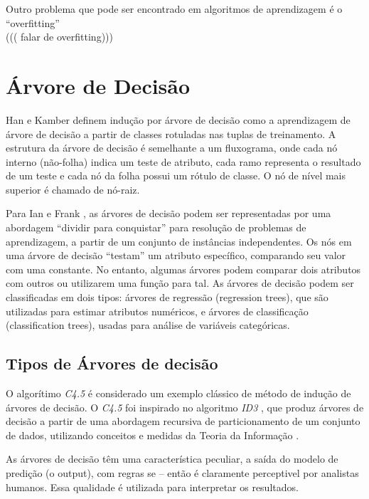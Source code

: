 Outro problema que pode ser encontrado em algoritmos de aprendizagem é o ``overfitting''\\

((( falar de overfitting)))

\pagebreak

\section{Árvore de Decisão}

Han e Kamber \cite{DataMining} definem indução por árvore de decisão como a aprendizagem de árvore de decisão a partir de classes rotuladas nas tuplas de treinamento. 
A estrutura da árvore de decisão é semelhante a um fluxograma, onde cada nó interno (não-folha) indica um teste de atributo, cada ramo representa o resultado de um teste e 
cada nó da folha possui um rótulo de classe. O nó de nível mais superior é chamado de nó-raiz.


Para Ian e Frank \cite{MachineLearning}, as árvores de decisão podem ser representadas por uma abordagem ``dividir para conquistar'' para resolução de problemas de 
aprendizagem, a partir de um conjunto de instâncias independentes. Os nós em uma árvore de decisão ``testam'' um atributo específico, comparando seu valor com uma constante.
No entanto, algumas árvores podem comparar dois atributos com outros ou utilizarem uma função para tal.
As árvores de decisão podem ser classificadas em dois tipos: árvores de regressão (regression trees), que são utilizadas para estimar atributos numéricos, e árvores de 
classificação (classification trees), usadas para análise de variáveis categóricas.


\subsection{Tipos de Árvores de decisão}
O algorítimo \textit{C4.5} é considerado um exemplo clássico de método de indução de árvores de decisão. O \textit{C4.5} \cite{Learning2007} foi inspirado no algoritmo 
\textit{ID3} \cite{Learning1979}, que produz árvores de decisão a partir de uma abordagem recursiva de particionamento de um conjunto de dados, utilizando conceitos e medidas 
da Teoria da Informação \cite{TeoriaInf}.

As árvores de decisão têm uma característica peculiar, a saída do modelo de predição (o output), com regras se -- então é claramente perceptivel por analistas humanos.
Essa qualidade é utilizada para interpretar os resultados.


